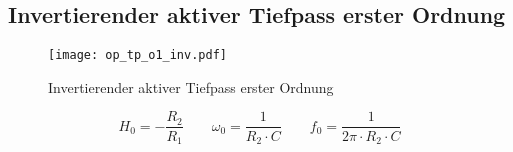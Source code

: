 



\subsection{Invertierender aktiver Tiefpass erster Ordnung}
\label{filt:o1-tp}
\begin{figure}[h!]
	\centering
	\texttt{[image: op\_tp\_o1\_inv.pdf]}
	\caption{Invertierender aktiver Tiefpass erster Ordnung}
	\label{sch:op-tp-o1-inv}
\end{figure}
\[ H_0 = - \frac{R_2}{R_1} \qquad
\omega_0 = \frac{1}{R_2 \cdot C} \qquad
f_0 = \frac{1}{2 \pi \cdot R_2 \cdot C} \]